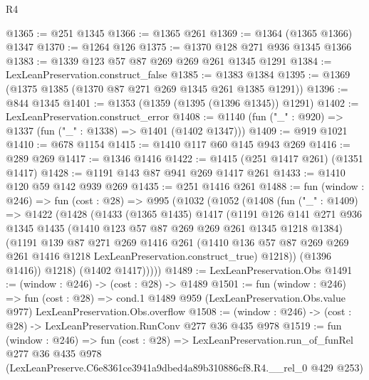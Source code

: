 \begin{lexlean}{R4}
\begin{coremodule}
@1365 := @251 @1345
@1366 := @1365 @261
@1369 := @1364 (@1365 @1366) @1347
@1370 := @1264 @126
@1375 := @1370 @128 @271 @936 @1345 @1366
@1383 := @1339 @123 @57 @87 @269 @269 @261 @1345 @1291
@1384 := LexLeanPreservation.construct_false
@1385 := @1383 @1384
@1395 := @1369 (@1375 @1385 (@1370 @87 @271 @269 @1345 @261 @1385 @1291))
@1396 := @844 @1345
@1401 := @1353 (@1359 (@1395 (@1396 @1345)) @1291)
@1402 := LexLeanPreservation.construct_error
@1408 := @1140 (fun ("_" : @920) => @1337 (fun ("_" : @1338) => @1401 (@1402 @1347)))
@1409 := @919 @1021
@1410 := @678 @1154
@1415 := @1410 @117 @60 @145 @943 @269
@1416 := @289 @269
@1417 := @1346 @1416
@1422 := @1415 (@251 @1417 @261) (@1351 @1417)
@1428 := @1191 @143 @87 @941 @269 @1417 @261
@1433 := @1410 @120 @59 @142 @939 @269
@1435 := @251 @1416 @261
@1488 := fun (window : @246) =>
  fun (cost : @28) =>
  @995
    (@1032
      (@1052
        (@1408
          (fun ("_" : @1409) =>
          @1422
            (@1428
              (@1433
                (@1365 @1435)
                @1417
                (@1191
                  @126
                  @141
                  @271
                  @936
                  @1345
                  @1435
                  (@1410 @123 @57 @87 @269 @269 @261 @1345 @1218 @1384)
                  (@1191
                    @139
                    @87
                    @271
                    @269
                    @1416
                    @261
                    (@1410
                      @136
                      @57
                      @87
                      @269
                      @269
                      @261
                      @1416
                      @1218
                      LexLeanPreservation.construct_true)
                    @1218))
                (@1396 @1416))
              @1218)
            (@1402 @1417)))))
@1489 := LexLeanPreservation.Obs
@1491 := (window : @246) -> (cost : @28) -> @1489
@1501 := fun (window : @246) =>
  fun (cost : @28) =>
  cond.{1} @1489 @959 (LexLeanPreservation.Obs.value @977) LexLeanPreservation.Obs.overflow
@1508 := (window : @246) -> (cost : @28) -> LexLeanPreservation.RunConv @277 @36 @435 @978
@1519 := fun (window : @246) =>
  fun (cost : @28) =>
  LexLeanPreservation.run_of_funRel
    @277
    @36
    @435
    @978
    (LexLeanPreserve.C6e8361ce3941a9dbed4a89b310886cf8.R4.__rel_0 @429 @253)
\end{coremodule}
\end{lexlean}
